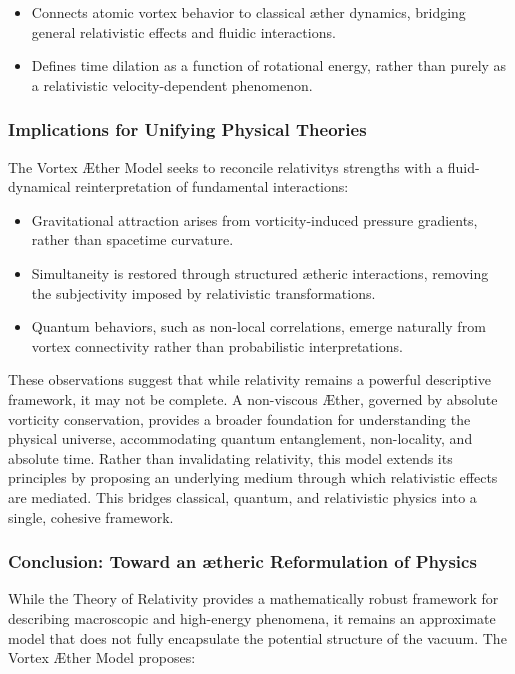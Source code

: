 \begin{itemize}
    \item Connects atomic vortex behavior to classical æther dynamics, bridging general relativistic effects and fluidic interactions.
    \item Defines time dilation as a function of rotational energy, rather than purely as a relativistic velocity-dependent phenomenon.
\end{itemize}
\subsubsection*{Implications for Unifying Physical Theories}
The Vortex Æther Model seeks to reconcile relativity\rqs s strengths with a fluid-dynamical reinterpretation of fundamental interactions:

\begin{itemize}
    \item Gravitational attraction arises from vorticity-induced pressure gradients, rather than spacetime curvature.
    \item Simultaneity is restored through structured ætheric interactions, removing the subjectivity imposed by relativistic transformations.
    \item Quantum behaviors, such as non-local correlations, emerge naturally from vortex connectivity rather than probabilistic interpretations.
\end{itemize}
These observations suggest that while relativity remains a powerful descriptive framework, it may not be complete. A non-viscous Æther, governed by absolute vorticity conservation, provides a broader foundation for understanding the physical universe, accommodating quantum entanglement, non-locality, and absolute time.
Rather than invalidating relativity, this model extends its principles by proposing an underlying medium through which relativistic effects are mediated.
This bridges classical, quantum, and relativistic physics into a single, cohesive framework.

\subsubsection*{Conclusion: Toward an ætheric Reformulation of Physics}
While the Theory of Relativity provides a mathematically robust framework for describing macroscopic and high-energy phenomena, it remains an approximate model that does not fully encapsulate the potential structure of the vacuum.
The Vortex Æther Model proposes:

